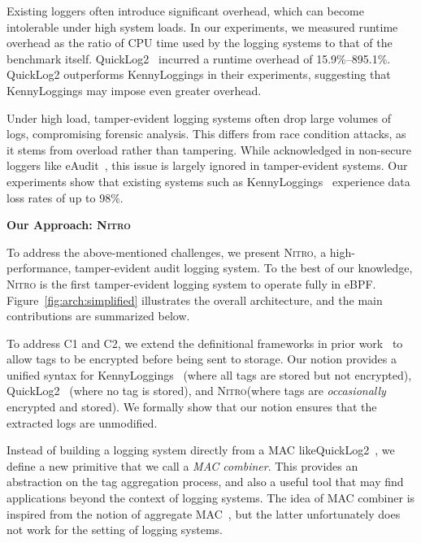 \documentclass[sigconf]{sty/acmart}
\newcommand{\Sys}{\mbox{\textsc{Nitro}}\xspace}
\newcommand{\qltwo}{QuickLog2\xspace}
\newcommand{\ed}{eAudit\xspace}
\newcommand{\kl}{KennyLoggings\xspace}
\newcommand{\heading}[1]{\vspace{6pt}\noindent{\underline{\textsc{#1}}}}
\begin{document}
\smallskip
{} Existing loggers often introduce significant overhead, which can become intolerable under high system loads. In our experiments, we measured runtime overhead as the ratio of CPU time used by the logging systems to that of the benchmark itself.  \qltwo~\cite{281386} incurred a runtime overhead of 15.9\%--895.1\%. \qltwo outperforms \kl in their experiments, suggesting that \kl may impose even greater overhead.

\smallskip
{} Under high load, tamper-evident logging systems often drop large volumes of logs, compromising forensic analysis. This differs from race condition attacks, as it stems from overload rather than tampering. While acknowledged in non-secure loggers like \ed~\cite{Sekar2023eAA}, this issue is largely ignored in tamper-evident systems. Our experiments show that existing systems such as \kl~\cite{kennylog,281386} experience data loss rates of up to 98\%.

\smallskip
\noindent\textbf{Our Approach: \Sys}
\smallskip

\noindent
To address the above-mentioned challenges, we present \Sys, a high-performance, tamper-evident audit logging system. To the best of our knowledge, \Sys is the first tamper-evident logging system to operate fully in eBPF. Figure~\ref{fig:arch:simplified} illustrates the overall architecture, and the main contributions are summarized below.


\heading{1. Provable security.}
To address C1 and C2, we extend the definitional frameworks in prior work~\cite{kennylog,281386}
to allow tags to be encrypted before being sent to storage. 
Our notion provides a unified syntax for \kl~\cite{kennylog} (where all tags are stored but not encrypted), 
\qltwo~\cite{281386} (where no tag is stored), and \Sys (where tags are \emph{occasionally} encrypted and stored). 
We formally show that our notion ensures that the extracted logs are unmodified. 



Instead of building a logging system directly from a MAC like\qltwo~\cite{281386}, 
we define a new primitive that we call a \emph{MAC combiner}. 
This provides an abstraction on the tag aggregation process, and also a useful tool that 
may find applications beyond the context of logging systems. 
The idea of MAC combiner is inspired from the notion of aggregate MAC~\cite{XOR}, 
but the latter unfortunately does not work for the setting of logging systems. 
\end{document}
